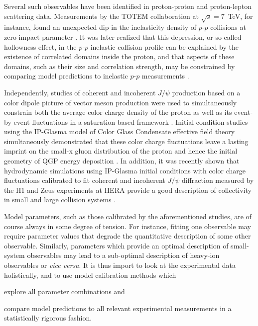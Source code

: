 \documentclass[aps,prc,reprint,amsmath,nofootinbib]{revtex4-1}
\begin{document}
Several such observables have been identified in proton-proton and proton-lepton scattering data.
Measurements by the TOTEM collaboration at $\sqrt{s}=7$~TeV, for instance, found an unexpected dip in the inelasticity density of $p$-$p$ collisions at zero impact parameter \cite{Antchev:2011zz}.
It was later realized that this depression, or so-called hollowness effect, in the $p$-$p$ inelastic collision profile \cite{Arriola2016} can be explained by the existence of correlated domains inside the proton, and that aspects of these domains, such as their size and correlation strength, may be constrained by comparing model predictions to inelastic $p$-$p$ measurements \cite{Albacete:2016gxu, Albacete:2016pmp}.

Independently, studies of coherent and incoherent $J/\psi$ production based on a color dipole picture of vector meson production were used to simultaneously constrain both the average color charge density of the proton as well as its event-by-event fluctuations in a saturation based framework \cite{Mantysaari:2016ykx, Mantysaari:2016jaz, Aaron:2009aa, Abramowicz:2015mha}.
Initial condition studies using the IP-Glasma model of Color Glass Condensate effective field theory \cite{Schenke:2012wb} simultaneously demonstrated that these color charge fluctuations leave a lasting imprint on the \mbox{small-x} gluon distribution of the proton and hence the initial geometry of QGP energy deposition \cite{Schlichting:2014ipa}.
In addition, it was recently shown that hydrodynamic simulations using IP-Glasma initial conditions with color charge fluctuations calibrated to fit coherent and incoherent $J/\psi$ diffraction measured by the H1 and Zeus experiments at HERA \cite{Aaron:2009aa, Abramowicz:2015mha} provide a good description of collectivity in small and large collision systems \cite{Schenke:2018fci}.

Model parameters, such as those calibrated by the aforementioned studies, are of course always in some degree of tension.
For instance, fitting one observable may require parameter values that degrade the quantitative description of some other observable.
Similarly, parameters which provide an optimal description of small-system observables may lead to a sub-optimal description of heavy-ion observables or \emph{vice versa}.
It is thus import to look at the experimental data holistically, and to use model calibration methods which
\begin{enumerate*}[label=(\arabic*)]
  \item
    explore all parameter combinations and
  \item
    compare model predictions to all relevant experimental measurements in a statistically rigorous fashion.
\end{enumerate*}
\end{document}
